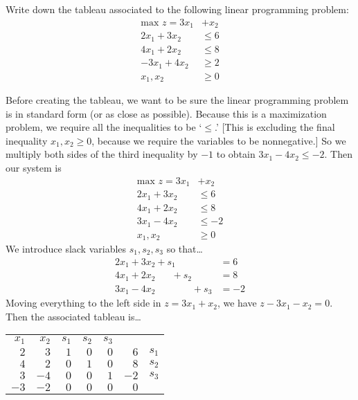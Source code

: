 \documentclass[11pt,letterpaper]{article}
\begin{document}

 Write down the tableau associated to the following linear programming problem:
	\[
	\begin{aligned}
	\text{max }  z= 3x_1 &+ x_2 \\
	2x_1 + 3x_2&\leq 6 \\
	4x_1 + 2x_2&\leq 8 \\
	-3x_1 + 4x_2&\geq 2 \\
	x_1, x_2&\geq 0
	\end{aligned}
	\] \pspace

\sol Before creating the tableau, we want to be sure the linear programming problem is in standard form (or as close as possible). Because this is a maximization problem, we require all the inequalities to be `$\leq$.' [This is excluding the final inequality $x_1, x_2 \geq 0$, because we require the variables to be nonnegative.] So we multiply both sides of the third inequality by $-1$ to obtain $3x_1 - 4x_2 \leq - 2$. Then our system is
	\[
	\begin{aligned}
	\text{max }  z= 3x_1 &+ x_2 \\
	2x_1 + 3x_2&\leq 6 \\
	4x_1 + 2x_2&\leq 8 \\
	3x_1 - 4x_2&\leq -2 \\
	x_1, x_2&\geq 0
	\end{aligned}
	\] 
We introduce slack variables $s_1, s_2, s_3$ so that\dots
	\[
	\begin{aligned}	
	2x_1 + 3x_2 + s_1 \phantom{+ s_2 + s_3}&= 6 \\
	4x_1 + 2x_2 \phantom{+ s_1} + s_2 \phantom{+ s_3}&= 8 \\
	3x_1 - 4x_2 \phantom{+ s_1 + s_2} + s _3&= -2
	\end{aligned}
	\] 
Moving everything to the left side in $z= 3x_1 + x_2$, we have $z - 3x_1 - x_2= 0$. Then the associated tableau is\dots
	\begin{table}[!ht]
	\centering
	\begin{tabular}{rrrrrr r}
	{\small $x_1$} & {\small $x_2$} & {\small $s_1$} & {\small $s_2$} & {\small $s_3$} \\
	$2$ & $3$ & $1$ & $0$ & \multicolumn{1}{r|}{$0$} & $6$ & {\small $s_1$} \\
	$4$ & $2$ & $0$ & $1$ & \multicolumn{1}{r|}{$0$} & $8$ & {\small $s_2$} \\
	$3$ & $-4$ & $0$ & $0$ & \multicolumn{1}{r|}{$1$} & $-2$ & {\small $s_3$}\\ \cline{1-6}
	$-3$ & $-2$ & $0$ & $0$ & \multicolumn{1}{r|}{$0$} & $0$ 
	\end{tabular}
	\end{table}
\end{document}
